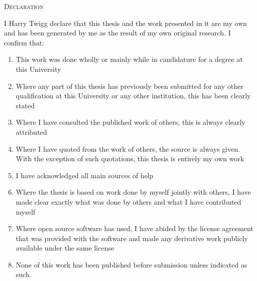 \begin{center}
    \textsc{Declaration}
\end{center}

I Harry Twigg declare that this thesis and   the work presented in it are my own and has 
been generated by me as the result of my own original research. I confirm that:

\begin{enumerate}
    \item This work was done wholly or mainly while in candidature for a degree at this University
    \item Where any part of this thesis has previously been submitted for any other qualification at this 
    University or any other institution, this has been clearly stated
    \item Where I have consulted the published work of others, this is always clearly attributed
    \item Where I have quoted from the work of others, the source is always given. With the exception of such
    quotations, this thesis is entirely my own work
    \item I have acknowledged all main sources of help
    \item Where the thesis is based on work done by myself jointly with others, I have made clear exactly what 
    was done by others and what I have contributed myself
    \item Where open source software has used, I have abided by the license agreement that was provided with the software and made any derivative work publicly available under the same license
    \item None of this work has been published before submission unless indicated as such.
\end{enumerate}
